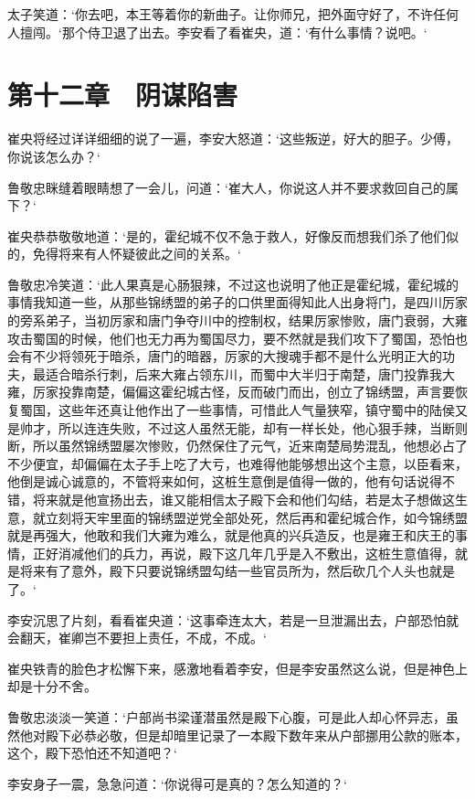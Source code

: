 太子笑道：‘你去吧，本王等着你的新曲子。让你师兄，把外面守好了，不许任何人擅闯。‘那个侍卫退了出去。李安看了看崔央，道：‘有什么事情？说吧。‘

\chapter{第十二章　阴谋陷害}

崔央将经过详详细细的说了一遍，李安大怒道：‘这些叛逆，好大的胆子。少傅，你说该怎么办？‘

鲁敬忠眯缝着眼睛想了一会儿，问道：‘崔大人，你说这人并不要求救回自己的属下？‘

崔央恭恭敬敬地道：‘是的，霍纪城不仅不急于救人，好像反而想我们杀了他们似的，免得将来有人怀疑彼此之间的关系。‘

鲁敬忠冷笑道：‘此人果真是心肠狠辣，不过这也说明了他正是霍纪城，霍纪城的事情我知道一些，从那些锦绣盟的弟子的口供里面得知此人出身将门，是四川厉家的旁系弟子，当初厉家和唐门争夺川中的控制权，结果厉家惨败，唐门衰弱，大雍攻击蜀国的时候，他们也无力再为蜀国尽力，要不然就是我们攻下了蜀国，恐怕也会有不少将领死于暗杀，唐门的暗器，厉家的大搜魂手都不是什么光明正大的功夫，最适合暗杀行刺，后来大雍占领东川，而蜀中大半归于南楚，唐门投靠我大雍，厉家投靠南楚，偏偏这霍纪城古怪，反而破门而出，创立了锦绣盟，声言要恢复蜀国，这些年还真让他作出了一些事情，可惜此人气量狭窄，镇守蜀中的陆侯又是帅才，所以连连失败，不过这人虽然无能，却有一样长处，他心狠手辣，当断则断，所以虽然锦绣盟屡次惨败，仍然保住了元气，近来南楚局势混乱，他想必占了不少便宜，却偏偏在太子手上吃了大亏，也难得他能够想出这个主意，以臣看来，他倒是诚心诚意的，不管将来如何，这桩生意倒是值得一做的，他有句话说得不错，将来就是他宣扬出去，谁又能相信太子殿下会和他们勾结，若是太子想做这生意，就立刻将天牢里面的锦绣盟逆党全部处死，然后再和霍纪城合作，如今锦绣盟就是再强大，他敢和我们大雍为难么，就是他真的兴兵造反，也是雍王和庆王的事情，正好消减他们的兵力，再说，殿下这几年几乎是入不敷出，这桩生意值得，就是将来有了意外，殿下只要说锦绣盟勾结一些官员所为，然后砍几个人头也就是了。‘

李安沉思了片刻，看看崔央道：‘这事牵连太大，若是一旦泄漏出去，户部恐怕就会翻天，崔卿岂不要担上责任，不成，不成。‘

崔央铁青的脸色才松懈下来，感激地看着李安，但是李安虽然这么说，但是神色上却是十分不舍。

鲁敬忠淡淡一笑道：‘户部尚书梁谨潜虽然是殿下心腹，可是此人却心怀异志，虽然他对殿下必恭必敬，但是却暗里记录了一本殿下数年来从户部挪用公款的账本，这个，殿下恐怕还不知道吧？‘

李安身子一震，急急问道：‘你说得可是真的？怎么知道的？‘

